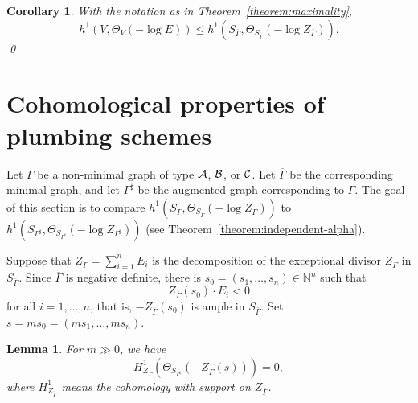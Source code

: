 \documentclass[a4paper, reqno, twoside]{amsart}
\newtheorem{lemma}[theorem]{Lemma}
\newtheorem{corollary}[theorem]{Corollary}
\theoremstyle{definition}
\numberwithin{equation}{section}
\begin{document}
\begin{corollary}\label{corollary:maximality}
With the notation as in Theorem~\ref{theorem:maximality},
\[
h^1(V, \Theta_V(-\log{E})) \le h^1(S_{\overline{\Gamma}},
\Theta_{S_{\overline{\Gamma}}}(-\log{Z_{\overline{\Gamma}}})).
\]
\qed
\end{corollary}

\section{Cohomological properties of plumbing schemes}
\label{sec:cohomological-properties}

Let $\Gamma$ be a non-minimal graph of type ${\ensuremath \mathcal{A}}$, ${\ensuremath \mathcal{B}}$, or
${\ensuremath \mathcal{C}}$. Let $\overline{\Gamma}$ be the corresponding minimal graph,
and let $\Gamma^{\sharp}$ be the augmented graph corresponding to
$\Gamma$. The goal of this section is to compare
$h^1(S_{\overline{\Gamma}},
\Theta_{S_{\overline{\Gamma}}}(-\log{Z_{\overline{\Gamma}}}))$ to
$h^1(S_{\Gamma^{\sharp}},
\Theta_{S_{\Gamma^{\sharp}}}(-\log{Z_{\Gamma^{\sharp}}}))$ (see
Theorem~\ref{theorem:independent-alpha}).

Suppose that $Z_{\overline{\Gamma}} = \sum_{i=1}^{n} E_i$ is the decomposition of the exceptional divisor $Z_{\overline{\Gamma}}$ in $S_{\overline{\Gamma}}$. Since $\overline{\Gamma}$ is negative definite, there is $s_0=(s_1,\dotsc,s_n) \in \mathbb{N}^n$ such that
\[Z_{\overline{\Gamma}}(s_0)\cdot E_i < 0\]
for all $i=1,\dotsc,n$, that is, $-Z_{\overline{\Gamma}}(s_0)$ is
ample in $S_{\overline{\Gamma}}$. Set $s = ms_0=(ms_1, \dotsc, ms_n)$.

\begin{lemma}\label{lemma:easy-vanishing}
For $m \gg 0$, we have
\[H^1_{Z_{\overline{\Gamma}}}(\Theta_{S_{\Gamma^{\sharp}}}(-Z_{\overline{\Gamma}}(s))) =0,\]
where $H^1_{Z_{\overline{\Gamma}}}$ means the cohomology with support on $Z_{\overline{\Gamma}}$.
\end{lemma}
\end{document}

